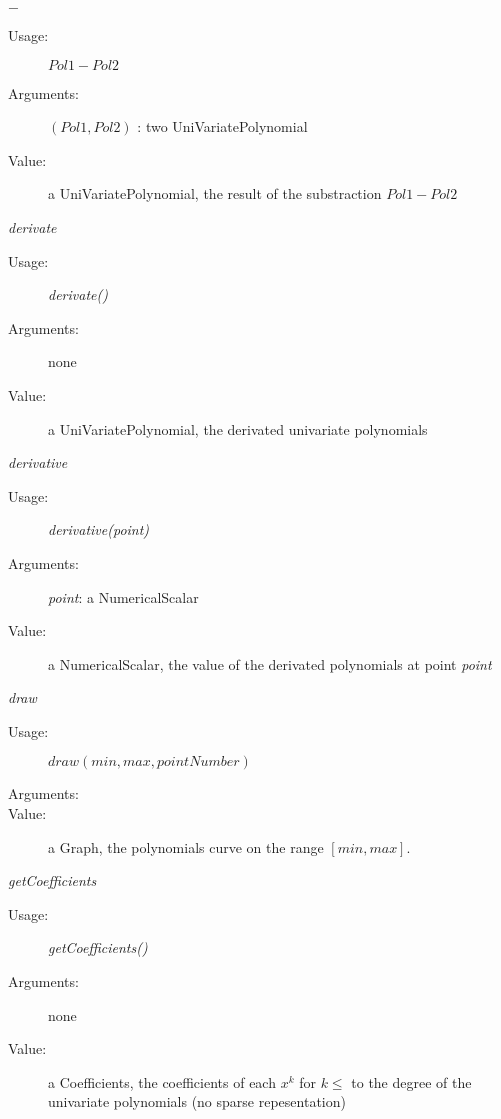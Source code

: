 \begin{description}
\begin{description}
\item $-$
\begin{description}
\item[Usage:]  $Pol1-Pol2$
\item[Arguments:] $(Pol1, Pol2)$ : two UniVariatePolynomial
\item[Value:] a UniVariatePolynomial, the result of the substraction  $Pol1-Pol2$
\end{description}
\bigskip

\item \textit{derivate}
\begin{description}
\item[Usage:] \textit{derivate()}
\item[Arguments:] none
\item[Value:] a UniVariatePolynomial, the derivated univariate polynomials
\end{description}
\bigskip

\item \textit{derivative}
\begin{description}
\item[Usage:] \textit{derivative(point)}
\item[Arguments:] \textit{point}: a NumericalScalar
\item[Value:] a NumericalScalar, the value of the derivated polynomials at point \textit{point}
\end{description}
\bigskip

\item \textit{draw}
\begin{description}
\item[Usage:] $draw(min, max, pointNumber)$
\item[Arguments:] \rule{0pt}{1em}
\item[Value:] a Graph, the polynomials curve on the range $[min, max]$.
\end{description}

\item \textit{getCoefficients}
\begin{description}
\item[Usage:] \textit{getCoefficients()}
\item[Arguments:] none
\item[Value:] a Coefficients, the coefficients of each $x^k$ for $k \leq$ to the degree of the univariate polynomials (no sparse repesentation)
\end{description}
\bigskip


\end{description}
\end{description}
